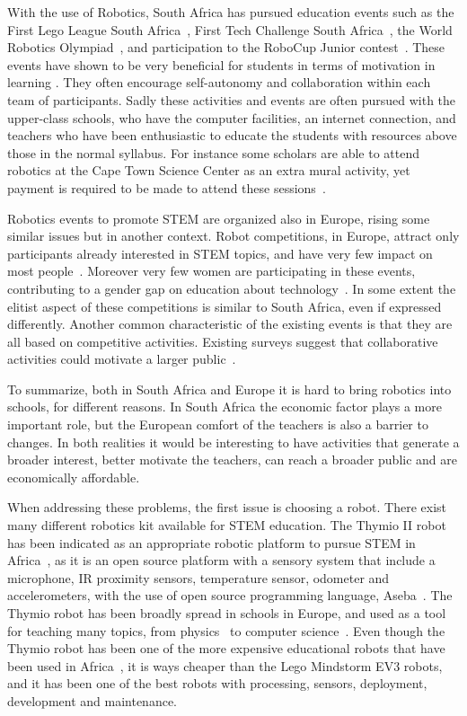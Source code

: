 \documentclass{intech-journal}
\begin{document}
With the use of Robotics, South Africa has pursued education events such as the First Lego League South Africa~\cite{FLLSA}, First Tech Challenge South Africa~\cite{FTCA}, the World Robotics Olympiad~\cite{WRO}, and participation to the RoboCup Junior contest~\cite{ferrein2011robocup}. 
These events have shown to be very beneficial for students in terms of motivation in learning \cite{deci1985intrinsic}. 
They often encourage self-autonomy and collaboration within each team of participants.
Sadly these activities and events are often pursued with the upper-class schools, who have the computer facilities, an internet connection, and teachers who have been enthusiastic to educate the students with resources above those in the normal syllabus. 
For instance some scholars are able to attend robotics at the Cape Town Science Center as an extra mural activity, yet payment is required to be made to attend these sessions~\cite{Capets}.

Robotics events to promote STEM are organized also in Europe, rising some similar issues but in another context.
Robot competitions, in Europe, attract only participants already interested in STEM topics, and have very few impact on most people~\cite{riedo2013upgrade}.
Moreover very few women are participating in these events, contributing to a gender gap on education about technology~\cite{riedo2013upgrade}.
In some extent the elitist aspect of these competitions is similar to South Africa, even if expressed differently.
Another common characteristic of the existing events is that they are all based on competitive activities. 
Existing surveys suggest that collaborative activities could motivate a larger public~\cite{riedo2013upgrade}.

To summarize, both in South Africa and Europe it is hard to bring robotics into schools, for different reasons. 
In South Africa the economic factor plays a more important role, but the European comfort of the teachers is also a barrier to changes.
In both realities it would be interesting to have activities that generate a broader interest, better motivate the teachers, can reach a broader public and are economically affordable.


When addressing these problems, the first issue is choosing a robot.
There exist many different robotics kit available for STEM education. 
The Thymio II robot has been indicated as an appropriate robotic platform to pursue STEM in Africa~\cite{Gyebi2015}, as it is an open source platform with a sensory system that include a microphone, IR proximity sensors, temperature sensor, odometer and accelerometers, with the use of open source programming language, Aseba~\cite{magnenat2010aseba}. 
The Thymio robot has been broadly spread in schools in Europe\cite{roy2015inirobot}, and used as a tool for teaching many topics, from physics~\cite{Mubin2013} to computer science~\cite{magnenat2014}. 
Even though the Thymio robot has been one of the more expensive educational robots that have been used in Africa~\cite{Gyebi2015}, it is ways cheaper than the Lego Mindstorm EV3 robots, and it has been one of the best robots with processing, sensors, deployment, development and maintenance.
\end{document}
